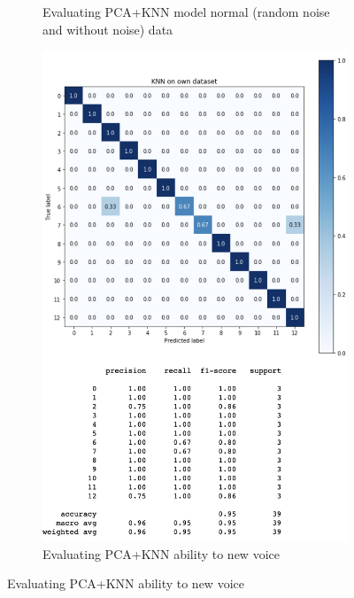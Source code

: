\documentclass[%
  article,%
  10pt,%
  a4paper,%
  fleqn,%
  oneside,%
  sumario = tradicional,%
  chapter = TITLE,%
  section = TITLE,%
]{abntex2}
\begin{document}
\begin{figure}
\begin{minipage}[b]{.4\textwidth}
\begin{figure}[H]
  \caption{Evaluating PCA+KNN model normal (random noise and without noise) data}
  \label{fig:knnall}
\end{figure}
\end{minipage}\qquad
\begin{minipage}[b]{.4\textwidth}
\begin{figure}[H]
  \centering
  \includegraphics[width = \columnwidth]{./Figuras/knnown}
   \caption{Evaluating PCA+KNN ability to new voice}
   \label{fig:knnown}
\end{figure}
\end{minipage}
\end{figure}
\end{document}
